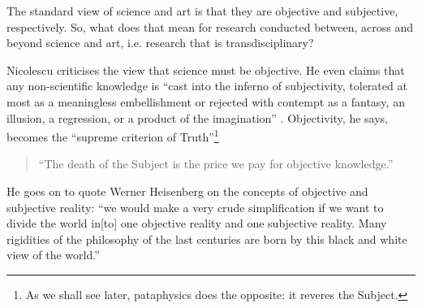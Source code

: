 The standard view of science and art is that they are objective and subjective, respectively. So, what does that mean for research conducted between, across and beyond science and art, i.e. research that is transdisciplinary?

Nicolescu criticises the view that science must be objective. He even claims that any non-scientific knowledge is ``cast into the inferno of subjectivity, tolerated at most as a meaningless embellishment or rejected with contempt as a fantasy, an illusion, a regression, or a product of the imagination'' \autocite{Nicolescu2010}. Objectivity, he says, becomes the ``supreme criterion of Truth''\footnote{As we shall see later, pataphysics does the opposite: it reveres the Subject.}

\begin{quote}
  ``The death of the Subject is the price we pay for objective knowledge.'' \autocite{Nicolescu2010}
\end{quote}

He goes on to quote Werner Heisenberg on the concepts of objective and subjective reality: ``we would make a very crude simplification if we want to divide the world in[to] one objective reality and one subjective reality. Many rigidities of the philosophy of the last centuries are born by this black and white view of the world.'' \autocite[Heisenberg, cited in][]{Nicolescu2010}

